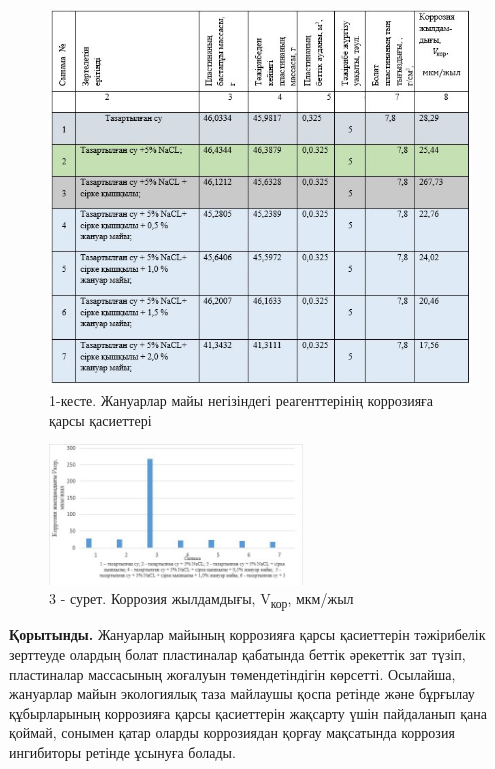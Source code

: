 \begin{figure}[H]
	\caption*{ 1-кесте. Жануарлар майы негізіндегі реагенттерінің коррозияға
	қарсы қасиеттері}
	\centering
	\includegraphics[width=\textwidth]{media/gor/image24.2}
	
\end{figure}



\begin{figure}[H]
	\centering
	\includegraphics[width=0.6\textwidth]{media/gor/image24.5}
	\caption*{3 - сурет. Коррозия жылдамдығы, V\textsubscript{кор}, мкм/жыл }
\end{figure}

\begin{multicols}{2}



{\bfseries Қорытынды.} Жануарлар майының коррозияға қарсы қасиеттерін
тәжірибелік зерттеуде олардың болат пластиналар қабатында беттік
әрекеттік зат түзіп, пластиналар массасының жоғалуын төмендетіндігін
көрсетті. Осылайша, жануарлар майын экологиялық таза майлаушы қоспа
ретінде және бұрғылау құбырларының коррозияға қарсы қасиеттерін жақсарту
үшін пайдаланып қана қоймай, сонымен қатар оларды коррозиядан қорғау
мақсатында коррозия ингибиторы ретінде ұсынуға болады.
\end{multicols}


